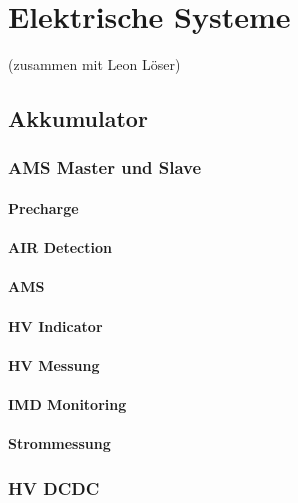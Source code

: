 
\chapter{Elektrische Systeme} (zusammen mit Leon Löser)
\section{Akkumulator}

\subsection{AMS Master und Slave}

\subsubsection{Precharge}

\subsubsection{AIR Detection}

\subsubsection{AMS}

\subsubsection{HV Indicator}

\subsubsection{HV Messung}

\subsubsection{IMD Monitoring}

\subsubsection{Strommessung}

\subsection{HV DCDC}

